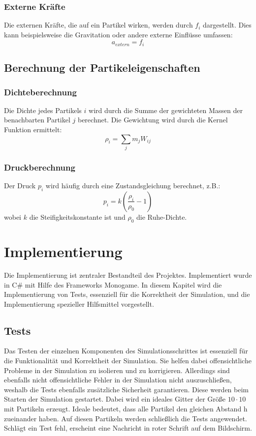 \documentclass[a4paper, 12pt]{article}
\begin{document}
\subsubsection{Externe Kräfte}
Die externen Kräfte, die auf ein Partikel wirken, werden durch \( f_i \) dargestellt. Dies kann beispielsweise die Gravitation oder andere externe Einflüsse umfassen:
\begin{equation}
	a_{extern} = f_i
\end{equation}
\subsection{Berechnung der Partikeleigenschaften}
\subsubsection{Dichteberechnung}
Die Dichte jedes Partikels \(i\) wird durch die Summe der gewichteten Massen der benachbarten Partikel \(j\) berechnet. Die Gewichtung wird durch die Kernel Funktion ermittelt:
\begin{equation} \label{equ:localDichte}
	\rho_i = \sum_j m_j W_{ij}
\end{equation}

\subsubsection{Druckberechnung}
Der Druck \(p_i\) wird häufig durch eine Zustandsgleichung \cite{Adams2007} berechnet, z.B.:
\begin{equation} \label{equ:lokalDruck}
	p_i = k (\frac{\rho_i}{\rho_0} - 1)
\end{equation}
wobei \(k\) die Steifigkeitskonstante ist und \(\rho_0\) die Ruhe-Dichte.

\section{Implementierung} \label{Kap:Implementierung}
Die Implementierung ist zentraler Bestandteil des Projektes. Implementiert wurde in C\# mit Hilfe des Frameworks Monogame. In diesem Kapitel wird die Implementierung von Tests, essenziell für die Korrektheit der Simulation, und die Implementierung spezieller Hilfsmittel vorgestellt. 

\subsection{Tests}
Das Testen der einzelnen Komponenten des Simulationsschrittes ist essenziell für die Funktionalität und Korrektheit der Simulation. Sie helfen dabei offensichtliche Probleme in der Simulation zu isolieren und zu korrigieren. Allerdings sind ebenfalls nicht offensichtliche Fehler in der Simulation nicht auszuschließen, weshalb die Tests ebenfalls zusätzliche Sicherheit garantieren. Diese werden beim Starten der Simulation gestartet. Dabei wird ein ideales Gitter der Größe  $10 \cdot 10$  mit Partikeln erzeugt. \glqq Ideale\grqq{} bedeutet, dass alle Partikel den gleichen Abstand h zueinander haben. Auf diesen Partikeln werden schließlich die Tests angewendet. Schlägt ein Test fehl, erscheint eine Nachricht in roter Schrift auf dem Bildschirm. 
\end{document}
